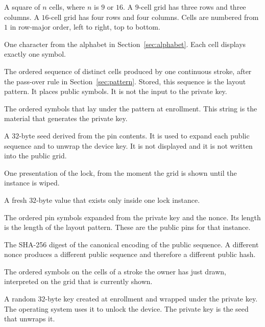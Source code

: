 \documentclass[11pt]{article}
\begin{document}
\begin{description}[leftmargin=7.5em,style=nextline]
  \item[Grid]
    A square of \(n\) cells, where \(n\) is \(9\) or \(16\).
    A \(9\)-cell grid has three rows and three columns.
    A \(16\)-cell grid has four rows and four columns.
    Cells are numbered from \(1\) in row-major order, left to right, top to bottom.
  \item[Symbol]
    One character from the alphabet in Section~\ref{sec:alphabet}.
    Each cell displays exactly one symbol.
  \item[Pattern]
    The ordered sequence of distinct cells produced by one continuous stroke, after the pass-over rule in Section~\ref{sec:pattern}.
    Stored, this sequence is the layout pattern.
    It places public symbols.
    It is not the input to the private key.
  \item[Pin contents]
    The ordered symbols that lay under the pattern at enrollment.
    This string is the material that generates the private key.
  \item[Private key]
    A \(32\)-byte seed derived from the pin contents.
    It is used to expand each public sequence and to unwrap the device key.
    It is not displayed and it is not written into the public grid.
  \item[Lock instance]
    One presentation of the lock, from the moment the grid is shown until the instance is wiped.
  \item[Nonce]
    A fresh \(32\)-byte value that exists only inside one lock instance.
  \item[Public sequence]
    The ordered pin symbols expanded from the private key and the nonce.
    Its length is the length of the layout pattern.
    These are the public pins for that instance.
  \item[Public hash]
    The SHA-256 digest of the canonical encoding of the public sequence.
    A different nonce produces a different public sequence and therefore a different public hash.
  \item[Readout]
    The ordered symbols on the cells of a stroke the owner has just drawn, interpreted on the grid that is currently shown.
  \item[Device key]
    A random \(32\)-byte key created at enrollment and wrapped under the private key.
    The operating system uses it to unlock the device.
    The private key is the seed that unwraps it.
\end{description}
\end{document}
